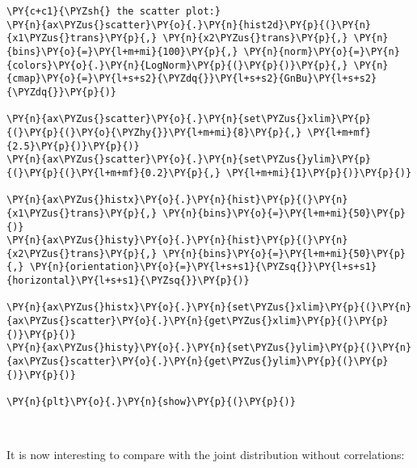 \begin{tcolorbox}[breakable, size=fbox, boxrule=1pt, pad at break*=1mm,colback=cellbackground, colframe=cellborder]
\begin{Verbatim}[commandchars=\\\{\}]
\PY{c+c1}{\PYZsh{} the scatter plot:}
\PY{n}{ax\PYZus{}scatter}\PY{o}{.}\PY{n}{hist2d}\PY{p}{(}\PY{n}{x1\PYZus{}trans}\PY{p}{,} \PY{n}{x2\PYZus{}trans}\PY{p}{,} \PY{n}{bins}\PY{o}{=}\PY{l+m+mi}{100}\PY{p}{,} \PY{n}{norm}\PY{o}{=}\PY{n}{colors}\PY{o}{.}\PY{n}{LogNorm}\PY{p}{(}\PY{p}{)}\PY{p}{,} \PY{n}{cmap}\PY{o}{=}\PY{l+s+s2}{\PYZdq{}}\PY{l+s+s2}{GnBu}\PY{l+s+s2}{\PYZdq{}}\PY{p}{)}

\PY{n}{ax\PYZus{}scatter}\PY{o}{.}\PY{n}{set\PYZus{}xlim}\PY{p}{(}\PY{p}{(}\PY{o}{\PYZhy{}}\PY{l+m+mi}{8}\PY{p}{,} \PY{l+m+mf}{2.5}\PY{p}{)}\PY{p}{)}
\PY{n}{ax\PYZus{}scatter}\PY{o}{.}\PY{n}{set\PYZus{}ylim}\PY{p}{(}\PY{p}{(}\PY{l+m+mf}{0.2}\PY{p}{,} \PY{l+m+mi}{1}\PY{p}{)}\PY{p}{)}

\PY{n}{ax\PYZus{}histx}\PY{o}{.}\PY{n}{hist}\PY{p}{(}\PY{n}{x1\PYZus{}trans}\PY{p}{,} \PY{n}{bins}\PY{o}{=}\PY{l+m+mi}{50}\PY{p}{)}
\PY{n}{ax\PYZus{}histy}\PY{o}{.}\PY{n}{hist}\PY{p}{(}\PY{n}{x2\PYZus{}trans}\PY{p}{,} \PY{n}{bins}\PY{o}{=}\PY{l+m+mi}{50}\PY{p}{,} \PY{n}{orientation}\PY{o}{=}\PY{l+s+s1}{\PYZsq{}}\PY{l+s+s1}{horizontal}\PY{l+s+s1}{\PYZsq{}}\PY{p}{)}

\PY{n}{ax\PYZus{}histx}\PY{o}{.}\PY{n}{set\PYZus{}xlim}\PY{p}{(}\PY{n}{ax\PYZus{}scatter}\PY{o}{.}\PY{n}{get\PYZus{}xlim}\PY{p}{(}\PY{p}{)}\PY{p}{)}
\PY{n}{ax\PYZus{}histy}\PY{o}{.}\PY{n}{set\PYZus{}ylim}\PY{p}{(}\PY{n}{ax\PYZus{}scatter}\PY{o}{.}\PY{n}{get\PYZus{}ylim}\PY{p}{(}\PY{p}{)}\PY{p}{)}

\PY{n}{plt}\PY{o}{.}\PY{n}{show}\PY{p}{(}\PY{p}{)}
\end{Verbatim}
\end{tcolorbox}

    \begin{center}
    \end{center}
    { \hspace*{\fill} \\}
    
    It is now interesting to compare with the joint distribution without
correlations:

